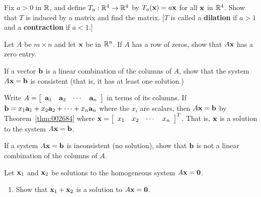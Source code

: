 \begin{multicols}{2}
\begin{ex}
\begin{sol}
\begin{enumerate}[label={\alph*.}]
\end{enumerate}
\end{sol}
\end{ex}

\begin{ex}
Fix $a > 0$ in $\mathbb{R}$, and define $T_{a} : \mathbb{R}^4 \to \mathbb{R}^4$ by $T_{a}(\textbf{x}) = a\textbf{x}$ for all $\textbf{x}$ in $\mathbb{R}^4$. Show that $T$ is induced by a matrix and find the matrix. [$T$ is called a \textbf{dilation} if $a > 1$ and a \textbf{contraction} if $a < 1$.]
\end{ex}

\begin{ex}
Let $A$ be $m \times n$ and let $\textbf{x}$ be in $\mathbb{R}^n$. If $A$ has a row of zeros, show that $A\textbf{x}$ has a zero entry.
\end{ex}

\begin{ex}
If a vector $\textbf{b}$ is a linear combination of the columns of $A$, show that the system $A\textbf{x} = \textbf{b}$ is consistent (that is, it has at least one solution.)

\begin{sol}
Write $A = \left[ \begin{array}{cccc}
\textbf{a}_{1} & \textbf{a}_{2} & \cdots & \textbf{a}_{n}
\end{array} \right]$ in terms of its columns. If $\textbf{b} = x_{1}\textbf{a}_{1} + x_{2}\textbf{a}_{2} + \cdots + x_{n}\textbf{a}_{n}$ where the $x_{i}$ are scalars, then $A\textbf{x} = \textbf{b}$ by Theorem~\ref{thm:002684} where $\textbf{x} = \left[ \begin{array}{cccc}
x_{1} & x_{2} & \cdots & x_{n} 
\end{array} \right]^{T}$. That is, $\textbf{x}$ is a solution to the system $A\textbf{x} = \textbf{b}$.
\end{sol}
\end{ex}

\begin{ex}
If a system $A\textbf{x} = \textbf{b}$ is inconsistent (no solution), show that $\textbf{b}$ is not a linear combination of the columns of $A$.
\end{ex}

\begin{ex}
Let $\textbf{x}_{1}$ and $\textbf{x}_{2}$ be solutions to the homogeneous system $A\textbf{x} = \textbf{0}$.


\begin{enumerate}[label={\alph*.}]
\item Show that $\textbf{x}_{1} + \textbf{x}_{2}$ is a solution to $A\textbf{x} = \textbf{0}$.


\end{enumerate}
\end{ex}
\end{multicols}
